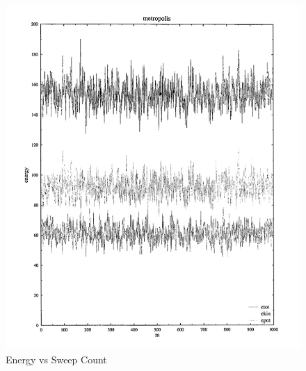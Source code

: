 \documentclass[11pt]{amsart}
\begin{document}
\begin{figure}[ht!]
\centering
\includegraphics[width=190mm]{EnergyPlot.jpg}
\caption{Energy vs Sweep Count}
\label{overflow}
\end{figure}
\end{document}
